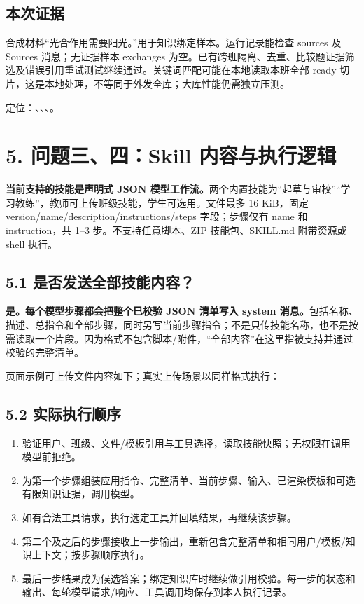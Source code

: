 \documentclass[UTF8,a4paper,10pt,fontset=fandol]{ctexart}
\begin{document}
\subsection*{本次证据}
合成材料“光合作用需要阳光。”用于知识绑定样本。运行记录能检查 sources 及 Sources 消息；无证据样本 exchanges 为空。已有跨班隔离、去重、比较题证据筛选及错误引用重试测试继续通过。关键词匹配可能在本地读取本班全部 ready 切片，这是本地处理，不等同于外发全库；大库性能仍需独立压测。

定位：、、、。

\newpage
\section*{5. 问题三、四：Skill 内容与执行逻辑}
\textbf{当前支持的技能是声明式 JSON 模型工作流。}两个内置技能为“起草与审校”“学习教练”，教师可上传班级技能，学生可选用。文件最多 16 KiB，固定 version/name/description/instructions/steps 字段；步骤仅有 name 和 instruction，共 1–3 步。不支持任意脚本、ZIP 技能包、SKILL.md 附带资源或 shell 执行。

\subsection*{5.1 是否发送全部技能内容？}
\textbf{是。每个模型步骤都会把整个已校验 JSON 清单写入 system 消息。}包括名称、描述、总指令和全部步骤，同时另写当前步骤指令；不是只传技能名称，也不是按需读取一个片段。因为格式不包含脚本/附件，“全部内容”在这里指被支持并通过校验的完整清单。

页面示例可上传文件内容如下；真实上传场景以同样格式执行：

\subsection*{5.2 实际执行顺序}
\begin{enumerate}
\item 验证用户、班级、文件/模板引用与工具选择，读取技能快照；无权限在调用模型前拒绝。
\item 为第一个步骤组装应用指令、完整清单、当前步骤、输入、已渲染模板和可选有限知识证据，调用模型。
\item 如有合法工具请求，执行选定工具并回填结果，再继续该步骤。
\item 第二个及之后的步骤接收上一步输出，重新包含完整清单和相同用户/模板/知识上下文；按步骤顺序执行。
\item 最后一步结果成为候选答案；绑定知识库时继续做引用校验。每一步的状态和输出、每轮模型请求/响应、工具调用均保存到本人执行记录。
\end{enumerate}
\end{document}

